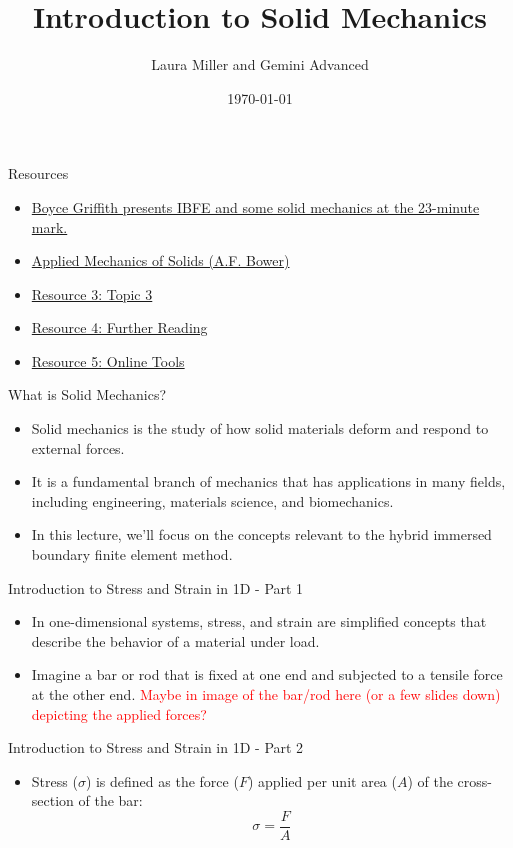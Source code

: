 \documentclass{beamer}
\title{Introduction to Solid Mechanics}
\author{Laura Miller and Gemini Advanced}
\date{\today}
\begin{document}
\frame{\titlepage}

\begin{frame}{Resources}
  \begin{itemize}
    \item \href{https://www.youtube.com/watch?v=-1TlNJL93sc}{Boyce Griffith presents IBFE and some solid mechanics at the 23-minute mark.}
    \item \href{https://solidmechanics.org/contents.php}{Applied Mechanics of Solids (A.F. Bower)}
    \item \href{https://example.com/resource3}{Resource 3: Topic 3}
    \item \href{https://example.com/resource4}{Resource 4: Further Reading}
    \item \href{https://example.com/resource5}{Resource 5: Online Tools}
  \end{itemize}
\end{frame}

\begin{frame}{What is Solid Mechanics?}
    \begin{itemize}
        \item Solid mechanics is the study of how solid materials deform and respond to external forces.
        \item It is a fundamental branch of mechanics that has applications in many fields, including engineering, materials science, and biomechanics.
        \item In this lecture, we'll focus on the concepts relevant to the hybrid immersed boundary finite element method.
    \end{itemize}
\end{frame}

\begin{frame}{Introduction to Stress and Strain in 1D - Part 1}
    \begin{itemize}
        \item In one-dimensional systems, stress, and strain are simplified concepts that describe the behavior of a material under load.
        \item Imagine a bar or rod that is fixed at one end and subjected to a tensile force at the other end. 
        \textcolor{red}{Maybe in image of the bar/rod here (or a few slides down) depicting the applied forces?}
    \end{itemize}
\end{frame}

\begin{frame}{Introduction to Stress and Strain in 1D - Part 2}
    \begin{itemize}
        \item Stress ($\sigma$) is defined as the force ($F$) applied per unit area ($A$) of the cross-section of the bar:
        \begin{equation*}
        \sigma = \frac{F}{A}
        \end{equation*}
    \end{itemize}
\end{frame}
\end{document}
